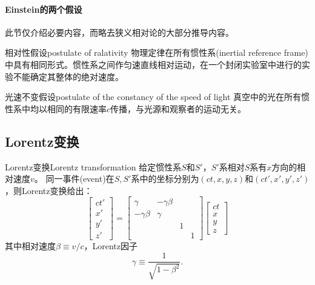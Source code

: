\paragraph{Einstein的两个假设}

此节仅介绍必要内容，而略去狭义相对论的大部分推导内容。%

\begin{theorem}
    {相对性假设}{postulate of ralativity}
    物理定律在所有惯性系(inertial reference frame)中具有相同形式。惯性系之间作匀速直线相对运动，在一个封闭实验室中进行的实验不能确定其整体的绝对速度。
\end{theorem}

\begin{theorem}
    {光速不变假设}{postulate of the constancy of the speed of light}
    真空中的光在所有惯性系中均以相同的有限速率$c$传播，与光源和观察者的运动无关。
\end{theorem}

\subsection{Lorentz变换}

\begin{theorem}
    {Lorentz变换}{Lorentz transformation}
    给定惯性系$S$和$S'$，$S'$系相对$S$系有$x$方向的相对速度$v$。
    同一事件(event)在$S,S'$系中的坐标分别为$(ct,x,y,z)$和$(ct',x',y',z')$，则Lorentz变换给出：
    \begin{equation}
    	\begin{bmatrix}
    		ct'\\x'\\y'\\z'
        \end{bmatrix} =
    	\begin{bmatrix}
        \gamma&-\gamma\beta\\-\gamma\beta&\gamma\\ &&1\\ &&&1
    	\end{bmatrix}
    	\begin{bmatrix}
    		ct\\x\\y\\z
    	\end{bmatrix}
    \end{equation}
    其中相对速度$\beta \equiv v/c$，Lorentz因子
    \begin{equation}
        \label{eq:ed-lorentz-factor}
        \gamma \equiv \frac1{\sqrt{1 - \beta^2}}.
    \end{equation}
\end{theorem}

